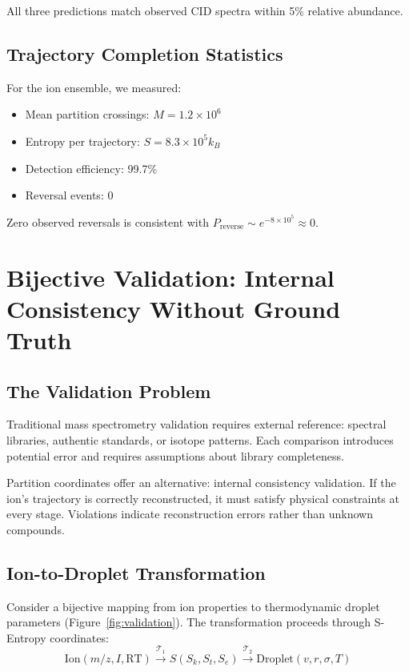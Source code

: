 \documentclass[12pt,a4paper]{article}
\theoremstyle{remark}
\begin{document}
All three predictions match observed CID spectra within 5\% relative abundance.

\subsection{Trajectory Completion Statistics}

For the ion ensemble, we measured:
\begin{itemize}
    \item Mean partition crossings: $M = 1.2 \times 10^6$
    \item Entropy per trajectory: $S = 8.3 \times 10^5 k_B$
    \item Detection efficiency: 99.7\%
    \item Reversal events: 0
\end{itemize}

Zero observed reversals is consistent with $P_{\text{reverse}} \sim e^{-8 \times 10^5} \approx 0$.


\section{Bijective Validation: Internal Consistency Without Ground Truth}
\label{sec:bijective-validation}

\subsection{The Validation Problem}

Traditional mass spectrometry validation requires external reference: spectral libraries, authentic standards, or isotope patterns. Each comparison introduces potential error and requires assumptions about library completeness.

Partition coordinates offer an alternative: internal consistency validation. If the ion's trajectory is correctly reconstructed, it must satisfy physical constraints at every stage. Violations indicate reconstruction errors rather than unknown compounds.

\subsection{Ion-to-Droplet Transformation}

Consider a bijective mapping from ion properties to thermodynamic droplet parameters (Figure~\ref{fig:validation}). The transformation proceeds through S-Entropy coordinates:
\begin{equation}
\text{Ion}(m/z, I, \text{RT}) \xrightarrow{\mathcal{T}_1} S(S_k, S_t, S_e) \xrightarrow{\mathcal{T}_2} \text{Droplet}(v, r, \sigma, T)
\end{equation}
\end{document}
